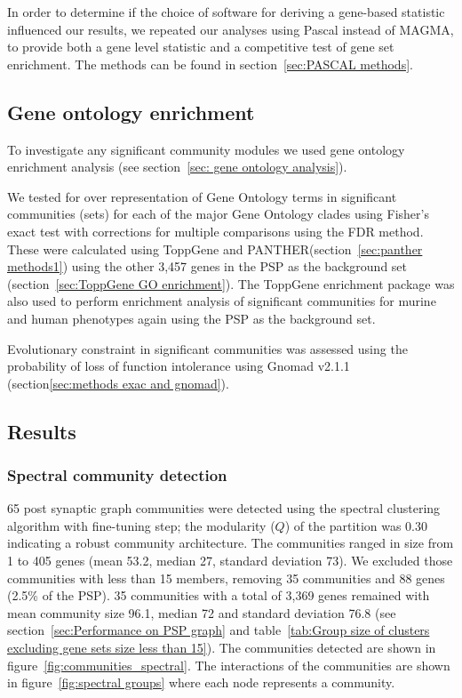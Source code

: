  








In order to determine if the choice of software for deriving a gene-based statistic influenced our results, we repeated our analyses using Pascal instead of MAGMA, to provide both a gene level statistic and a competitive test of gene set enrichment\cite{lamparter2016fast}. The methods can be found in section~\ref{sec:PASCAL methods}.

 


\subsection{Gene ontology enrichment}
\label{sec:gene ontology methods from chapter community detection}
To investigate any significant community modules we used gene ontology enrichment analysis (see section~\ref{sec: gene ontology analysis})\cite{mi2013large}.  

 We tested for over representation of Gene Ontology terms in significant communities (sets) for each of the major Gene Ontology clades using Fisher's exact test with corrections for multiple comparisons using the FDR method. These were calculated using ToppGene\cite{chen2009toppgene} and PANTHER(section~\ref{sec:panther methods1})\cite{mi2019protocol} using the other 3,457 genes in the PSP as the background set (section~\ref{sec:ToppGene GO enrichment}). The ToppGene enrichment package was also used to perform enrichment analysis of significant communities for murine and human phenotypes again using the PSP as the background set\cite{chen2009toppgene}.  

Evolutionary constraint in significant communities was assessed using the probability of loss of function intolerance  using Gnomad v2.1.1 (section\ref{sec:methods exac and gnomad}).


\subsection{Results}


\subsubsection{Spectral community detection}
65 post synaptic graph communities were detected using the spectral clustering algorithm with fine-tuning step; the modularity ($Q$) of the partition was 0.30 indicating a robust community architecture.  The communities ranged in size from 1 to 405 genes (mean 53.2, median 27, standard deviation 73). We excluded those communities with less than 15 members, removing 35 communities and 88 genes (2.5\% of the PSP). 35 communities with a total of 3,369 genes remained with mean community size 96.1, median 72 and standard deviation 76.8 (see section~\ref{sec:Performance on PSP graph} and table~\ref{tab:Group size of clusters excluding gene sets size less than 15}). The communities detected are shown in figure~\ref{fig:communities_spectral}. The interactions of the communities are shown in figure~\ref{fig:spectral groups} where each node represents a community. 

